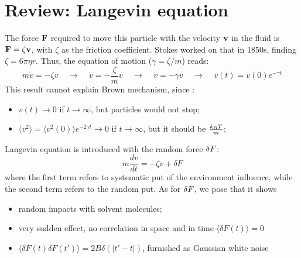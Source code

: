 \documentclass[fleqn,10pt]{InternshipReport_SI-ENS-PSL}
\begin{document}
\flushbottom %

\maketitle %

\thispagestyle{empty} %



\section*{Review: Langevin equation} %
The force $\mathbf{F}$ required to move this particle with the velocity $\mathbf{v}$ in the fluid is $\mathbf{F} = \zeta \mathbf{v}$, with $\zeta$ as the friction coefficient. Stokes worked on that in 1850s, finding $\zeta = 6 \pi \eta r$. Thus, the equation of motion ($\gamma = \zeta / m$) reads:
$$ m\dot{v} = -\zeta v \ \ \ \ \ \to \ \ \ \ \ \dot{v} = - \frac{\zeta}{m} v \ \ \ \ \ \to \ \ \ \ \ \dot{v} = -\gamma v \ \ \ \ \ \to \ \ \ \ \  v(t) = v(0) e^{-\gamma t} $$
This result cannot explain Brown mechanism, since :
\begin{itemize}
  \item $v(t) \to 0$ if $t\to\infty$, but particles would not stop;
  \item $\langle v^2 \rangle = \langle v^2(0) \rangle e^{-2\gamma t} \to 0$ if $t\to\infty$, but it should be $\frac{k_{\mathrm{B}} T}{m}$;
\end{itemize}

Langevin equation is introduced with the random force $\delta F$:
$$ m \frac{dv}{dt} = -\zeta v + \delta F $$
where the first term refers to systematic put of the environment influence, while the second term refers to the random put. 
As for $\delta F$, we pose that it shows
\begin{itemize}
  \item random impacts with solvent molecules;
  \item very sudden effect, no correlation in space and in time $\langle \delta F(t) \rangle = 0$
  \item $\langle \delta F(t) \delta F(t') \rangle = 2B \delta \left( \left\vert t' - t \right\vert \right)$, furnished as Gaussian white noise
\end{itemize}
\end{document}
